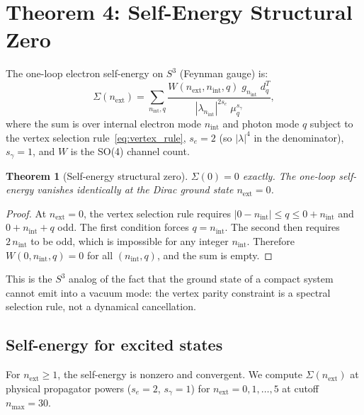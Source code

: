 \documentclass[11pt]{article}
\newtheorem{theorem}{Theorem}
\begin{document}
\section{Theorem 4: Self-Energy Structural Zero}
\label{sec:self_energy}

The one-loop electron self-energy on $S^3$ (Feynman gauge) is:
\begin{equation}
  \Sigma(n_{\mathrm{ext}}) = \sum_{n_{\mathrm{int}}, q}
    \frac{W(n_{\mathrm{ext}}, n_{\mathrm{int}}, q) \;
          g_{n_{\mathrm{int}}} \; d_q^T}
         {|\lambda_{n_{\mathrm{int}}}|^{2s_e} \; \mu_q^{s_\gamma}},
  \label{eq:self_energy}
\end{equation}
where the sum is over internal electron mode $n_{\mathrm{int}}$ and
photon mode $q$ subject to the vertex selection
rule~\eqref{eq:vertex_rule}, $s_e = 2$ (so $|\lambda|^4$ in the
denominator), $s_\gamma = 1$, and $W$ is the SO(4) channel count.

\begin{theorem}[Self-energy structural zero]
\label{thm:self_energy_zero}
$\Sigma(0) = 0$ exactly.  The one-loop self-energy vanishes
identically at the Dirac ground state $n_{\mathrm{ext}} = 0$.
\end{theorem}

\begin{proof}
At $n_{\mathrm{ext}} = 0$, the vertex selection rule requires
$|0 - n_{\mathrm{int}}| \le q \le 0 + n_{\mathrm{int}}$ and
$0 + n_{\mathrm{int}} + q$ odd.  The first condition forces
$q = n_{\mathrm{int}}$.  The second then requires
$2\,n_{\mathrm{int}}$ to be odd, which is impossible for any
integer $n_{\mathrm{int}}$.  Therefore $W(0, n_{\mathrm{int}}, q) = 0$
for all $(n_{\mathrm{int}}, q)$, and the sum is empty.
\end{proof}

\noindent This is the $S^3$ analog of the fact that the ground state
of a compact system cannot emit into a vacuum mode: the vertex parity
constraint is a spectral selection rule, not a dynamical cancellation.

\subsection{Self-energy for excited states}

For $n_{\mathrm{ext}} \ge 1$, the self-energy is nonzero and
convergent.  We compute $\Sigma(n_{\mathrm{ext}})$ at physical
propagator powers ($s_e = 2$, $s_\gamma = 1$) for $n_{\mathrm{ext}}
= 0, 1, \ldots, 5$ at cutoff $n_{\max} = 30$.
\end{document}
